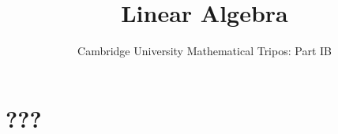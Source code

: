 \documentclass{article}
\title{Linear Algebra}
\author{Cambridge University Mathematical Tripos: Part IB}
\begin{document}
\maketitle

\tableofcontentsnewpage{}

\section{???}

\end{document}
